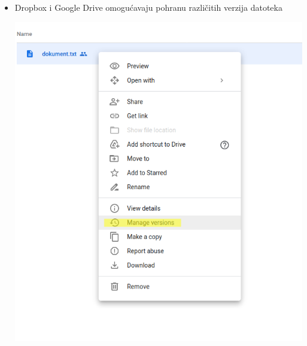\documentclass[aspectratio=169]{beamer}
\begin{document}
\begin{frame}
    \begin{itemize}
        \item Dropbox i Google Drive omogućavaju pohranu različitih verzija
            datoteka
            
        \vspace{1em}
            
        \begin{center}
            \includegraphics[scale=.25]{images/drive-vcs.png}
        \end{center}
    \end{itemize}
\end{frame}
\end{document}
